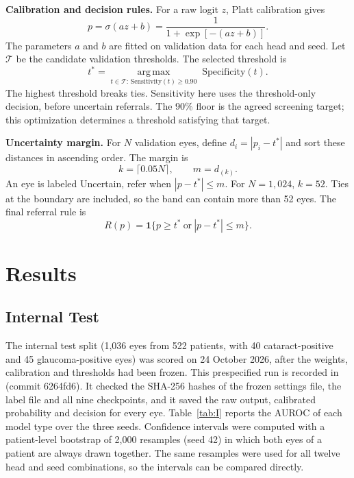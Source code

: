 \documentclass[conference,a4paper]{IEEEtran}
\begin{document}
\textbf{Calibration and decision rules.}
For a raw logit $z$, Platt calibration gives
\[
p=\sigma(az+b)=\frac{1}{1+\exp[-(az+b)]}.
\]
The parameters $a$ and $b$ are fitted on validation data for each head and seed.
Let $\mathcal{T}$ be the candidate validation thresholds. The selected threshold is
\[
t^*=\underset{t\in\mathcal{T}:\,\mathrm{Sensitivity}(t)\geq0.90}
{\operatorname{arg\,max}}\;\mathrm{Specificity}(t).
\]
The highest threshold breaks ties. Sensitivity here uses the threshold-only
decision, before uncertain referrals. The 90\% floor is the agreed screening
target; this optimization determines a threshold satisfying that target.



\textbf{Uncertainty margin.}
For $N$ validation eyes, define $d_i=|p_i-t^*|$ and sort these distances in
ascending order. The margin is
\[
k=\lceil0.05N\rceil,\qquad m=d_{(k)}.
\]
An eye is labeled Uncertain, refer when $|p-t^*|\leq m$.
For $N=1{,}024$, $k=52$. Ties at the boundary are included, so the band can
contain more than 52 eyes. The final referral rule is
\[
R(p)=\mathbf{1}\{p\geq t^*\ \text{or}\ |p-t^*|\leq m\}.
\]


\section{Results}

\subsection{Internal Test}

The internal test split (1,036 eyes from 522 patients, with 40 cataract-positive and 45
glaucoma-positive eyes) was scored on 24 October 2026, after the weights, calibration and thresholds
had been frozen. This prespecified run is recorded in
 (commit 6264fd6). It checked the SHA-256
hashes of the frozen settings file, the label file and all nine checkpoints, and it saved the raw
output, calibrated probability and decision for every eye. Table~\ref{tab:I} reports the AUROC of
each model type over the three seeds. Confidence intervals were computed with a patient-level
bootstrap of 2,000 resamples (seed 42) in which both eyes of a patient are always drawn together.
The same resamples were used for all twelve head and seed combinations, so the intervals can be
compared directly.
\end{document}

